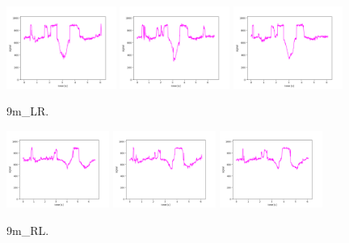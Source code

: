 \begin{figure}[!ht]
\begin{center}
\includegraphics[width=0.32\textwidth]{../data/9m_LR/9m_LR_1.png}
\includegraphics[width=0.32\textwidth]{../data/9m_LR/9m_LR_2.png}
\includegraphics[width=0.32\textwidth]{../data/9m_LR/9m_LR_3.png}
\caption{9m\_LR.\label{fig:9m_LR}}
\end{center}
\end{figure}

\begin{figure}[!ht]
\begin{center}
\includegraphics[width=0.3\textwidth]{../data/9m_RL/9m_RL_1.png}
\includegraphics[width=0.3\textwidth]{../data/9m_RL/9m_RL_2.png}
\includegraphics[width=0.3\textwidth]{../data/9m_RL/9m_RL_3.png}
\caption{9m\_RL.\label{fig:9m_RL}}
\end{center}
\end{figure}


